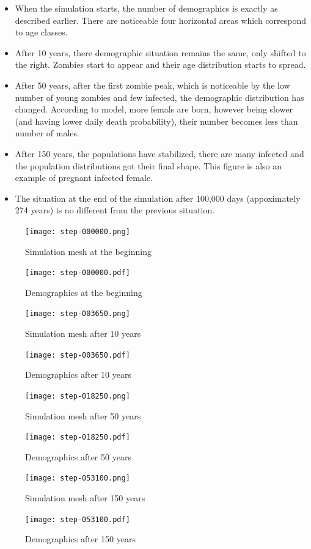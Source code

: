 \documentclass[a4paper]{article}
\begin{document}
\begin{itemize}
\item When the simulation starts, the number of demographics is exactly as described earlier.
    There are noticeable four horizontal areas which correspond to age classes.
\item After 10 years, there demographic situation remains the same, only shifted to the right.
    Zombies start to appear and their age distribution starts to spread.
\item After 50 years, after the first zombie peak, which is noticeable by the low number of young zombies and few infected, the demographic distribution has changed.
    According to model, more femals are born, however being slower (and having lower daily death probability), their number becomes less than number of males.
\item After 150 years, the populations have stabilized, there are many infected and the population distributions got their final shape.
    This figure is also an example of pregnant infected female.
\item The situation at the end of the simulation after 100,000 days (appoximately 274 years) is no different from the previous situation.
\end{itemize}

\begin{figure}[pht]
    \centering
    \texttt{[image: step-000000.png]}
    \caption{Simulation mesh at the beginning}
    \texttt{[image: step-000000.pdf]}
    \caption{Demographics at the beginning}
\end{figure}

\begin{figure}[pht]
    \centering
    \texttt{[image: step-003650.png]}
    \caption{Simulation mesh after 10 years}
    \texttt{[image: step-003650.pdf]}
    \caption{Demographics after 10 years}
\end{figure}

\begin{figure}[pht]
    \centering
    \texttt{[image: step-018250.png]}
    \caption{Simulation mesh after 50 years}
    \texttt{[image: step-018250.pdf]}
    \caption{Demographics after 50 years}
\end{figure}

\begin{figure}[pht]
    \centering
    \texttt{[image: step-053100.png]}
    \caption{Simulation mesh after 150 years}
    \texttt{[image: step-053100.pdf]}
    \caption{Demographics after 150 years}
\end{figure}
\end{document}
